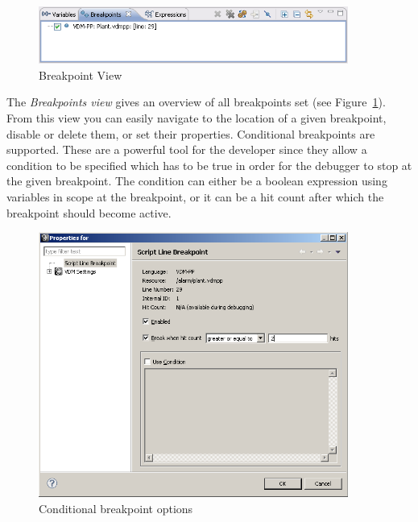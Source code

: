 \begin{figure}[htp]
\begin{center}
  \includegraphics[width=4in]{figures/BreakpointView}
  \caption{Breakpoint View}
  \label{fig:BreakpointView}
\end{center}
\end{figure}

The \emph{Breakpoints view} gives an overview of all breakpoints set
(see Figure~\ref{fig:BreakpointView}). From this view you
can easily navigate to the location of a given breakpoint, disable or
delete them, or set their properties. 
Conditional breakpoints are supported. These are a powerful tool for
the developer since they allow a condition to be specified which has
to be true in order for the debugger to stop at the given
breakpoint. The condition can either be a boolean expression using
variables in scope at the breakpoint, or it can be a hit count after
which the breakpoint should become active.

\begin{figure}[htp]
\begin{center}
  \includegraphics[width=4in]{figures/Breakpointconditional}
  \caption{Conditional breakpoint options}
  \label{fig:BreakpointConditional}
\end{center}
\end{figure}

